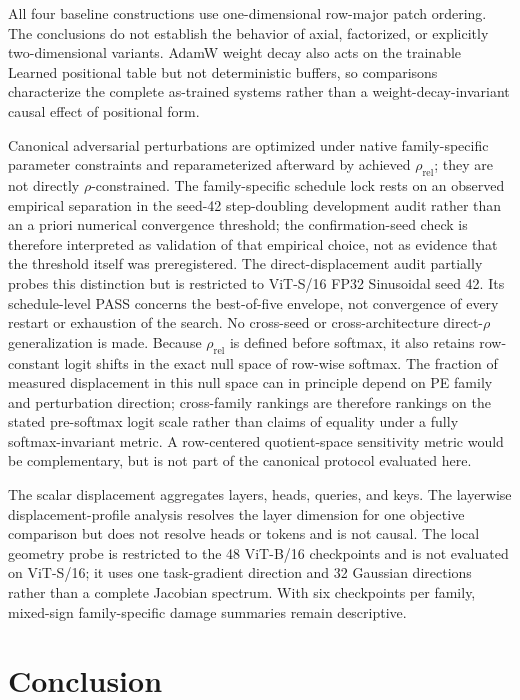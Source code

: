 \documentclass[preprint,12pt,authoryear]{elsarticle}
\begin{document}
All four baseline constructions use one-dimensional row-major patch
ordering. The conclusions do not establish the behavior of axial,
factorized, or explicitly two-dimensional variants. AdamW weight decay
also acts on the trainable Learned positional table but not deterministic
buffers, so comparisons characterize the complete as-trained systems
rather than a weight-decay-invariant causal effect of positional form.

Canonical adversarial perturbations are optimized under native
family-specific parameter constraints and reparameterized afterward by
achieved $\rho_{\mathrm{rel}}$; they are not directly $\rho$-constrained.
The family-specific schedule lock rests on an observed empirical separation in
the seed-42 step-doubling development audit rather than an a priori numerical
convergence threshold; the confirmation-seed check is therefore interpreted as
validation of that empirical choice, not as evidence that the threshold itself
was preregistered.
The direct-displacement audit partially probes this distinction but is
restricted to ViT-S/16 FP32
Sinusoidal seed 42. Its schedule-level PASS concerns the best-of-five
envelope, not convergence of every restart or exhaustion of the search.
No cross-seed or cross-architecture direct-$\rho$ generalization is made.
Because $\rho_{\mathrm{rel}}$ is defined before softmax, it also retains
row-constant logit shifts in the exact null space of row-wise softmax. The
fraction of measured displacement in this null space can in principle depend
on PE family and perturbation direction; cross-family rankings are therefore
rankings on the stated pre-softmax logit scale rather than claims of equality
under a fully softmax-invariant metric. A row-centered quotient-space
sensitivity metric would be complementary, but is not part of the canonical
protocol evaluated here.

The scalar displacement aggregates layers, heads, queries, and keys.
The layerwise displacement-profile analysis resolves the layer dimension for
one objective comparison but does
not resolve heads or tokens and is not causal. The local geometry probe is
restricted to the 48 ViT-B/16 checkpoints and is not evaluated on ViT-S/16;
it uses one task-gradient direction and 32 Gaussian directions rather than a
complete Jacobian spectrum. With six checkpoints per family, mixed-sign
family-specific damage summaries remain descriptive.

\section{Conclusion}
\label{sec:conclusion}
\end{document}
